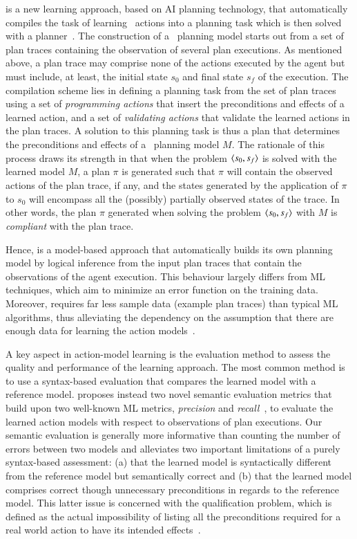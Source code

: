 \textcolor[rgb]{1.00,0.00,0.00}{\FAMA is a new learning approach, based on AI planning technology, that automatically compiles the task of learning \strips\ actions into a planning task which is then solved with a planner~\cite{aineto2018learning}. The construction of a \strips\ planning model starts out from a set of plan traces containing the observation of several plan executions. As mentioned above, a plan trace may comprise none of the actions executed by the agent but must include, at least, the initial state $s_0$ and final state $s_f$ of the execution. The compilation scheme lies in defining a planning task from the set of plan traces using a set of \emph{programming actions} that insert the preconditions and effects of a learned action, and a set of \emph{validating actions} that validate the learned actions in the plan traces. A solution to this planning task is thus a plan that determines the preconditions and effects of a \strips\ planning model $M$. The rationale of this process draws its strength in that when the problem ${\langle s_0,s_f \rangle}$ is solved with the learned model $M$, a plan $\pi$ is generated such that $\pi$ will contain the observed actions of the plan trace, if any, and the states generated by the application of $\pi$ to $s_0$ will encompass all the (possibly) partially observed states of the trace. In other words, the plan $\pi$ generated when solving the problem ${\langle s_0,s_f \rangle}$ with $M$ is \emph{compliant} with the plan trace. }

Hence, \FAMA is a model-based approach that automatically builds its own planning model by logical inference from the input plan traces that contain the observations of the agent execution. This behaviour largely differs from ML techniques, which aim to minimize an error function on the training data. Moreover, \FAMA requires far less sample data (example plan traces) than typical ML algorithms, thus alleviating the dependency on the assumption that there are enough data for learning the action models~\cite{Zhuo15}.

A key aspect in action-model learning is the evaluation method to assess the quality and performance of the learning approach. The most common method is to use a syntax-based evaluation that compares the learned model with a reference model. \FAMA proposes instead two novel semantic evaluation metrics that build upon two well-known ML metrics, {\em precision} and {\em recall}~\cite{davis2006relationship}, to evaluate the learned action models with respect to observations of plan executions. Our semantic evaluation is generally more informative than counting the number of errors between two models and alleviates two important limitations of a purely syntax-based assessment: (a) that the learned model is syntactically different from the reference model but semantically correct and (b) that the learned model comprises correct though unnecessary preconditions in regards to the reference model. This latter issue is concerned with the qualification problem, which is defined as the actual impossibility of listing all the preconditions required for a real world action to have its intended effects~\cite{GinsbergS88}.

